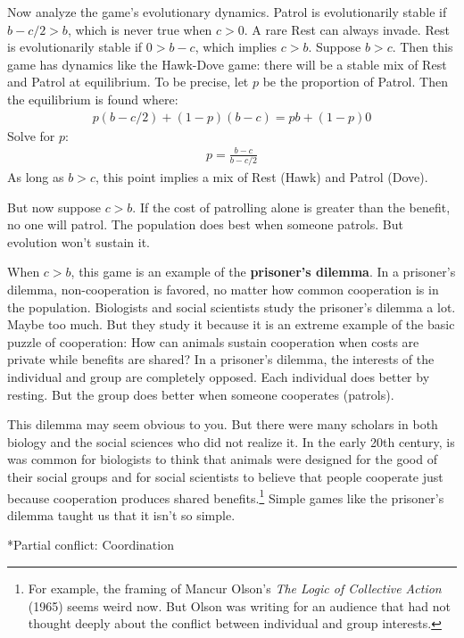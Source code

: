\documentclass[10pt,reqno]{amsbook}
\makeatletter
\newcommand{\bemph}[1]{{\textbf{\textcolor{bemphcol}{#1}}}}
\renewcommand\section{\@startsection{section}{1}
\z@{.7\linespacing\@plus\linespacing}{.5\linespacing}
{\large\bfseries\itshape}}
\numberwithin{equation}{chapter}
\makeatother
\begin{document}
Now analyze the game's evolutionary dynamics. Patrol is evolutionarily stable if $b-c/2 > b$, which is never true when $c>0$. A rare Rest can always invade. Rest is evolutionarily stable if $0 > b-c$, which implies $c > b$. Suppose $b>c$. Then this game has dynamics like the Hawk-Dove game: there will be a stable mix of Rest and Patrol at equilibrium. To be precise, let $p$ be the proportion of Patrol. Then the equilibrium is found where:
\begin{align*}
	p(b-c/2) + (1-p)(b-c) = pb + (1-p)0
\end{align*}
Solve for $p$:
\begin{align*}
	p = \frac{b-c}{b-c/2}
\end{align*}
As long as $b>c$, this point implies a mix of Rest (Hawk) and Patrol (Dove).

But now suppose $c>b$. If the cost of patrolling alone is greater than the benefit, no one will patrol. The population does best when someone patrols. But evolution won't sustain it.

When $c>b$, this game is an example of the \bemph{prisoner's dilemma}. In a prisoner's dilemma, non-cooperation is favored, no matter how common cooperation is in the population. Biologists and social scientists study the prisoner's dilemma a lot. Maybe too much. But they study it because it is an extreme example of the basic puzzle of cooperation: How can animals sustain cooperation when costs are private while benefits are shared? In a prisoner's dilemma, the interests of the individual and group are completely opposed. Each individual does better by resting. But the group does better when someone cooperates (patrols).

This dilemma may seem obvious to you. But there were many scholars in both biology and the social sciences who did not realize it. In the early 20th century, is was common for biologists to think that animals were designed for the good of their social groups and for social scientists to believe that people cooperate just because cooperation produces shared benefits.\footnote{For example, the framing of Mancur Olson's \emph{The Logic of Collective Action} (1965) seems weird now. But Olson was writing for an audience that had not thought deeply about the conflict between individual and group interests.} Simple games like the prisoner's dilemma taught us that it isn't so simple.

\section*{Partial conflict: Coordination}
\end{document}
